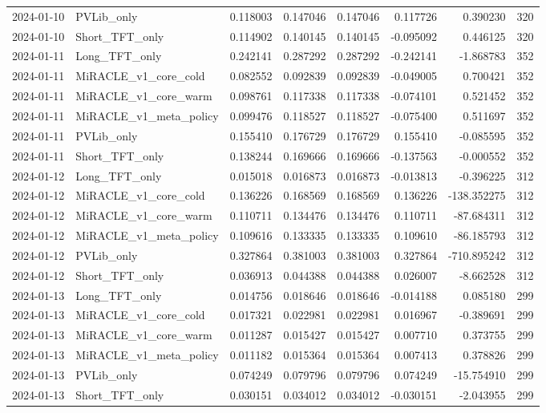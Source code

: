\begin{tabular}{llrrrrrr}
2024-01-10 & PVLib_only & 0.118003 & 0.147046 & 0.147046 & 0.117726 & 0.390230 & 320 \\
2024-01-10 & Short_TFT_only & 0.114902 & 0.140145 & 0.140145 & -0.095092 & 0.446125 & 320 \\
2024-01-11 & Long_TFT_only & 0.242141 & 0.287292 & 0.287292 & -0.242141 & -1.868783 & 352 \\
2024-01-11 & MiRACLE_v1_core_cold & 0.082552 & 0.092839 & 0.092839 & -0.049005 & 0.700421 & 352 \\
2024-01-11 & MiRACLE_v1_core_warm & 0.098761 & 0.117338 & 0.117338 & -0.074101 & 0.521452 & 352 \\
2024-01-11 & MiRACLE_v1_meta_policy & 0.099476 & 0.118527 & 0.118527 & -0.075400 & 0.511697 & 352 \\
2024-01-11 & PVLib_only & 0.155410 & 0.176729 & 0.176729 & 0.155410 & -0.085595 & 352 \\
2024-01-11 & Short_TFT_only & 0.138244 & 0.169666 & 0.169666 & -0.137563 & -0.000552 & 352 \\
2024-01-12 & Long_TFT_only & 0.015018 & 0.016873 & 0.016873 & -0.013813 & -0.396225 & 312 \\
2024-01-12 & MiRACLE_v1_core_cold & 0.136226 & 0.168569 & 0.168569 & 0.136226 & -138.352275 & 312 \\
2024-01-12 & MiRACLE_v1_core_warm & 0.110711 & 0.134476 & 0.134476 & 0.110711 & -87.684311 & 312 \\
2024-01-12 & MiRACLE_v1_meta_policy & 0.109616 & 0.133335 & 0.133335 & 0.109610 & -86.185793 & 312 \\
2024-01-12 & PVLib_only & 0.327864 & 0.381003 & 0.381003 & 0.327864 & -710.895242 & 312 \\
2024-01-12 & Short_TFT_only & 0.036913 & 0.044388 & 0.044388 & 0.026007 & -8.662528 & 312 \\
2024-01-13 & Long_TFT_only & 0.014756 & 0.018646 & 0.018646 & -0.014188 & 0.085180 & 299 \\
2024-01-13 & MiRACLE_v1_core_cold & 0.017321 & 0.022981 & 0.022981 & 0.016967 & -0.389691 & 299 \\
2024-01-13 & MiRACLE_v1_core_warm & 0.011287 & 0.015427 & 0.015427 & 0.007710 & 0.373755 & 299 \\
2024-01-13 & MiRACLE_v1_meta_policy & 0.011182 & 0.015364 & 0.015364 & 0.007413 & 0.378826 & 299 \\
2024-01-13 & PVLib_only & 0.074249 & 0.079796 & 0.079796 & 0.074249 & -15.754910 & 299 \\
2024-01-13 & Short_TFT_only & 0.030151 & 0.034012 & 0.034012 & -0.030151 & -2.043955 & 299 \\

\end{tabular}
